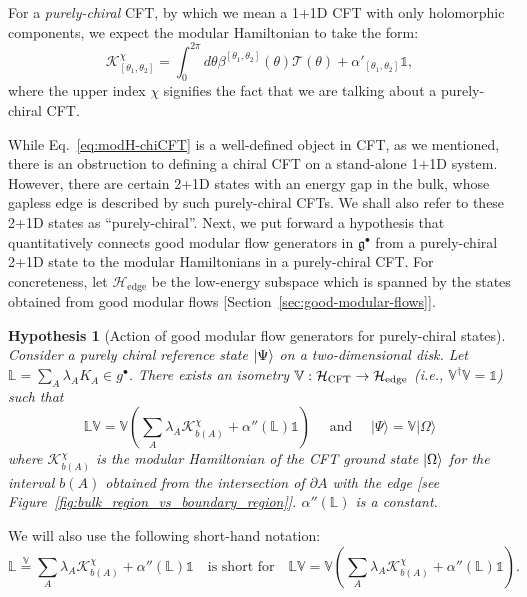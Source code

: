 \documentclass[12pt, nofootinbib]{article}
\theoremstyle{plain}
\theoremstyle{assumption}
\theoremstyle{definition}
\theoremstyle{plain}
\theoremstyle{plain}
\theoremstyle{plain}
\theoremstyle{plain}
\newcounter{hypothesisCounter}
\newtheorem{hypothesis}[hypothesisCounter]{Hypothesis}
\theoremstyle{plain}
\def\veq{\stackrel{\mathbb{V}}{=}}
\def\Kcft{\mathscr{K}}
\def\Tcft{\mathscr{T}}
\def\gc{\mathfrak{g}^{\bullet}}
\begin{document}
For a \emph{purely-chiral} CFT, by which we mean a 1+1D CFT with only holomorphic components, we expect the modular Hamiltonian to take the form: 
\begin{equation}\label{eq:modH-chiCFT} 
\Kcft_{[\theta_1,\theta_2]}^{\chi} = \int_0^{2\pi} d\theta\beta^{[\theta_1,\theta_2]}(\theta) \Tcft(\theta) + \alpha'_{[\theta_1,\theta_2]}\mathbb{1},
\end{equation}
where the upper index $\chi$ signifies the fact that we are talking about a purely-chiral CFT.

While Eq.~\eqref{eq:modH-chiCFT} is a well-defined object in CFT, as we mentioned, there is an obstruction to defining a chiral CFT on a stand-alone 1+1D system. However, there are certain 2+1D states with an energy gap in the bulk, whose gapless edge is described by such purely-chiral CFTs. We shall also refer to these 2+1D states as ``purely-chiral''. Next, we put forward a hypothesis that quantitatively connects good modular flow generators in $\gc$ from a purely-chiral 2+1D state to the modular Hamiltonians in a purely-chiral CFT. 
For concreteness, let $\mathcal{H}_{\text{edge}}$ be the low-energy subspace which is spanned by the states obtained from good modular flows [Section~\ref{sec:good-modular-flows}].

\begin{hypothesis}[Action of good modular flow generators for purely-chiral states]
\label{assump:chiral-CFT}
Consider a purely chiral reference state $\left|\Psi\right\rangle$ on a two-dimensional disk.  Let $\mathbb{L} = \sum_A \lambda_A K_A \in g^{\bullet}$. There exists an isometry $\mathbb{V}: \mathcal{H}_{\rm CFT} \to \mathcal{H}_{\rm edge}$ (i.e., $\mathbb{V}^{\dagger}\mathbb{V} = \mathbb{1}$) such that 
\begin{equation} \label{eq:conj:chiral-CFT}
    \mathbb{L} \mathbb{V} = \mathbb{V}\left( \sum_A \lambda_A  \Kcft_{b(A)}^{\chi} + \alpha''(\mathbb{L})\mathbb{1} \right) \quad \text{ and } \quad |\Psi\rangle = \mathbb{V} |\Omega\rangle%
\end{equation}
where $\Kcft_{b(A)}^{\chi}$ is the modular Hamiltonian of the CFT ground state $\left|\Omega\right\rangle$ for the interval $b(A)$ obtained from the intersection of $\partial A$ with the edge 
[see Figure~\ref{fig:bulk_region_vs_boundary_region}]. $\alpha''(\mathbb{L})$ is a constant.
\end{hypothesis} 
\noindent
We will also use the following short-hand notation: 
\begin{equation}
    \mathbb{L} \veq  \sum_A \lambda_A  \Kcft_{b(A)}^{\chi} + \alpha''(\mathbb{L})\mathbb{1} \quad \textrm{is short for} \quad \mathbb{L} \mathbb{V} =  \mathbb{V}\left( \sum_A \lambda_A  \Kcft_{b(A)}^{\chi}+ \alpha''(\mathbb{L})\mathbb{1}\right).
\end{equation}
\end{document}
